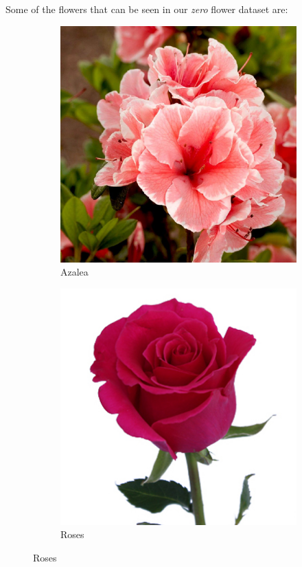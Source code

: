 \documentclass[11]{article}
\begin{document}
Some of the flowers that can be seen in our \textit{zero} flower dataset are:
\begin{figure}[H]
    \begin{subfigure}[t]{0.45\textwidth}
    \centering
  \includegraphics[scale=0.13]{images/azalea.jpg}
    \caption{Azalea}
    \label{azalea}
    \end{subfigure}
    \begin{subfigure}[t]{0.45\textwidth}
    \centering
    \includegraphics[scale=0.35]{images/roses.jpg}
    \caption{Roses}
    \label{roses}
    \end{subfigure}
\end{figure}
\end{document}
